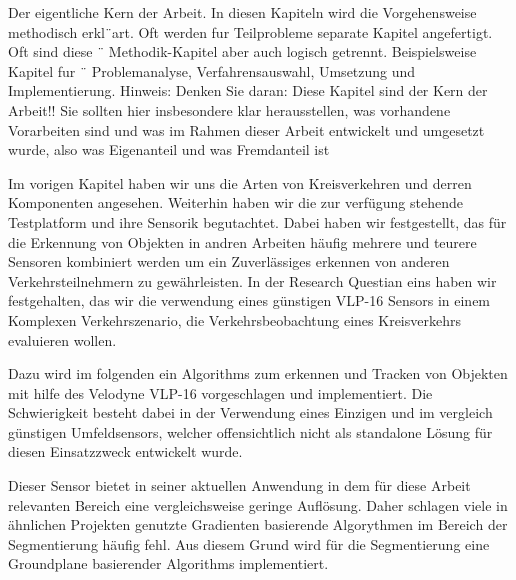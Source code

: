 \documentclass[11pt,oneside,openright]{mpreport}
\begin{document}
Der eigentliche Kern der Arbeit. In diesen Kapiteln wird die Vorgehensweise methodisch
erkl¨art. Oft werden fur Teilprobleme separate Kapitel angefertigt. Oft sind diese ¨
Methodik-Kapitel aber auch logisch getrennt. Beispielsweise Kapitel fur ¨ Problemanalyse,
Verfahrensauswahl, Umsetzung und Implementierung. Hinweis: Denken Sie daran:
Diese Kapitel sind der Kern der Arbeit!! Sie sollten hier insbesondere klar herausstellen,
was vorhandene Vorarbeiten sind und was im Rahmen dieser Arbeit entwickelt
und umgesetzt wurde, also was Eigenanteil und was Fremdanteil ist



Im vorigen Kapitel haben wir uns die Arten von Kreisverkehren und derren Komponenten angesehen.
Weiterhin haben wir die zur verfügung
stehende Testplatform und ihre Sensorik begutachtet. Dabei haben wir festgestellt, das für die Erkennung von Objekten in andren
Arbeiten häufig mehrere und teurere Sensoren kombiniert werden um ein Zuverlässiges erkennen von anderen Verkehrsteilnehmern zu gewährleisten.
In der Research Questian eins haben wir festgehalten, das wir die verwendung eines günstigen VLP-16 Sensors in einem 
Komplexen Verkehrszenario, die Verkehrsbeobachtung eines Kreisverkehrs evaluieren wollen.

Dazu wird im folgenden ein Algorithms zum erkennen und Tracken von Objekten mit hilfe des Velodyne VLP-16 vorgeschlagen
und implementiert. Die Schwierigkeit besteht dabei in der Verwendung eines Einzigen und im vergleich günstigen
Umfeldsensors, welcher offensichtlich nicht als standalone Lösung für diesen Einsatzzweck entwickelt wurde.

Dieser Sensor bietet in seiner aktuellen Anwendung in dem für diese Arbeit relevanten Bereich eine vergleichsweise
geringe Auflösung. Daher schlagen viele in ähnlichen Projekten genutzte Gradienten basierende Algorythmen im Bereich 
der Segmentierung häufig fehl.  Aus diesem Grund wird für die Segmentierung eine Groundplane basierender Algorithms implementiert.
\end{document}
